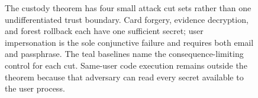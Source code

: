 \begin{figure}[H]
{%
}
\caption{The custody theorem has four small attack cut sets rather than one undifferentiated trust boundary. Card forgery, evidence decryption, and forest rollback each have one sufficient secret; user impersonation is the sole conjunctive failure and requires both email and passphrase. The teal baselines name the consequence-limiting control for each cut. Same-user code execution remains outside the theorem because that adversary can read every secret available to the user process.}
\label{fig:bonded-key-custody}
\end{figure}
